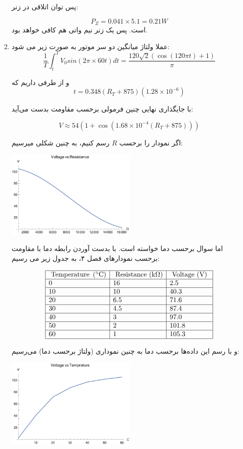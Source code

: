 \documentclass[12pt]{article}
\begin{document}
\begin{enumerate}
پس توان اتلاقی در زنر:

$$P_Z =0.041\times 5.1 = 0.21 W$$
است. پس یک زنر نیم واتی هم کافی خواهد بود.

\item

عملا ولتاژ میانگین دو سر موتور به صورت زیر می شود:
$$\frac{1}{T}\int_{t}^{T} V_0 sin(2 \pi \times 60 t) dt = \frac{120 \sqrt{2} (\cos (120 \pi  t)+1)}{\pi }$$

و از طرفی داریم که 
$$t = 0.348 (R_T + 875)(1.28 \times 10^{-6})$$ 

با جایگذاری نهایی چنین فرمولی برحسب مقاومت بدست می‌آید:

$$V \approx 54(1+\cos(1.68 \times 10^{-4}(R_T + 875)))$$

اگر نمودار را برحسب $R$ رسم کنیم، به چنین شکلی میرسیم:

\begin{center}
\includegraphics[width =0.5\textwidth]{images/1.pdf}	
\end{center}

اما سوال برحسب دما خواسته است. با بدست آوردن رابطه دما با مقاومت برحسب نمودارهای فصل ۴، به جدول زیر می رسیم:

$$
\begin{array}{|l|l|l|}
	\hline \text { Temperature }\left({ }^{\circ} \mathrm{C}\right) & \text { Resistance }(\mathrm{k} \Omega) & \text { Voltage (V) } \\
	\hline 0 & 16 & 2.5 \\
	\hline 10 & 10 & 40.3 \\
	\hline 20 & 6.5 & 71.6 \\
	\hline 30 & 4.5 & 87.4 \\
	\hline 40 & 3 & 97.0 \\
	\hline 50 & 2 & 101.8 \\
	\hline 60 & 1 & 105.3 \\
	\hline
\end{array}
$$

و با رسم این داده‌ها برحسب دما به چنین نموداری (ولتاژ برحسب دما) می‌رسیم:

\begin{center}
	\includegraphics[width =0.5\textwidth]{images/2.pdf}
\end{center}


\end{enumerate}

 
 
\end{document}
